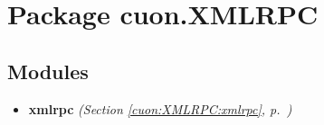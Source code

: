 %
%
%


\section{Package cuon.XMLRPC}

    \label{cuon:XMLRPC}


\subsection{Modules}

\begin{itemize}
\setlength{\parskip}{0ex}
\item \textbf{xmlrpc}
  \textit{(Section \ref{cuon:XMLRPC:xmlrpc}, p.~\pageref{cuon:XMLRPC:xmlrpc})}

\end{itemize}


